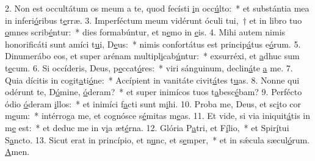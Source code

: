2. Non est occultátum os meum a te, quod fecísti \uline{i}n occ\uline{ú}lto:~* et substántia mea in inferi\uline{ó}ribus t\uline{e}rræ.
3. Imperféctum meum vidérunt óculi tui,~† et in libro tuo \uline{o}mnes scrib\uline{é}ntur:~* dies formabúntur, et n\uline{e}mo in \uline{e}is.
4. Mihi autem nimis honorificáti sunt amíci t\uline{u}i, D\uline{e}us:~* nimis confortátus est princip\uline{á}tus e\uline{ó}rum.
5. Dinumerábo eos, et super arénam multipl\uline{i}cab\uline{ú}ntur:~* exsurréxi, et \uline{a}dhuc sum t\uline{e}cum.
6. Si occíderis, Deus, p\uline{e}ccat\uline{ó}res:~* viri sánguinum, declin\uline{á}te \uline{a} me.
7. Quia dícitis in cogit\uline{a}ti\uline{ó}ne:~* Accípient in vanitáte civit\uline{á}tes t\uline{u}as.
8. Nonne qui odérunt te, D\uline{ó}mine, \uline{ó}deram?~* et super inimícos tuos t\uline{a}besc\uline{é}bam?
9. Perfécto ódio \uline{ó}deram \uline{i}llos:~* et inimíci f\uline{a}cti sunt m\uline{i}hi.
10. Proba me, Deus, et sc\uline{i}to cor m\uline{e}um:~* intérroga me, et cognósce s\uline{é}mitas m\uline{e}as.
11. Et vide, si via iniquit\uline{á}tis in m\uline{e} est:~* et deduc me in v\uline{i}a æt\uline{é}rna.
12. Glória P\uline{a}tri, et F\uline{í}lio,~* et Spir\uline{í}tui S\uline{a}ncto.
13. Sicut erat in princípio, et n\uline{u}nc, et s\uline{e}mper,~* et in sǽcula sæcul\uline{ó}rum. \uline{A}men.
